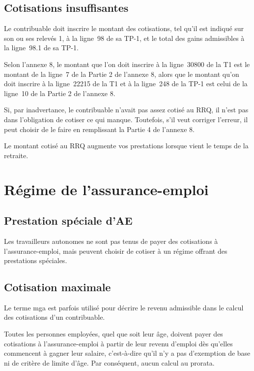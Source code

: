 \subsection{Cotisations insuffisantes}
Le contribuable doit inscrire le montant des cotisations, tel qu'il est indiqué sur son ou ses relevés 1, à la ligne~98 de sa TP-1, et le total des gains admissibles à la ligne~98.1 de sa TP-1. 

Selon l'annexe 8, le montant que l'on doit inscrire à la ligne~30800 de la T1 est le montant de la ligne~7 de la Partie 2 de l'annexe 8, alors que le montant qu'on doit inscrire à la ligne~22215 de la T1 et à la ligne~248 de la TP-1 est celui de la ligne~10 de la Partie 2 de l'annexe 8.

Si, par inadvertance, le contribuable n'avait pas assez cotisé au RRQ, il n'est pas dans l'obligation de cotiser ce qui manque. Toutefois, s'il veut corriger l'erreur, il peut choisir de le faire en remplissant la Partie 4 de l'annexe 8.

\begin{note}
	Le montant cotisé au RRQ augmente vos prestations lorsque vient le temps de la retraite.
\end{note}



\section{Régime de l'assurance-emploi}
\subsection{Prestation spéciale d'AE}
Les travailleurs autonomes ne sont pas tenus de payer des cotisations à l'assurance-emploi, mais peuvent choisir de cotiser à un régime offrant des prestations spéciales.


\subsection{Cotisation maximale}
\begin{note}
	Le terme \acrfull{mga} est parfois utilisé pour décrire le revenu admissible dans le calcul des cotisations d'un contribuable.
\end{note}
Toutes les personnes employées, quel que soit leur âge, doivent payer des cotisations à l'assurance-emploi à partir de leur revenu d'emploi dès qu'elles commencent à gagner leur salaire, c'est-à-dire qu'il n'y a pas d'exemption de base ni de critère de limite d'âge. Par conséquent, aucun calcul au prorata.


